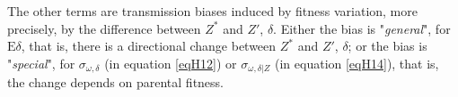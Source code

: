 The other terms are transmission biases induced by fitness variation, more precisely, by the difference between $Z^{\ast}$ and $Z'$, $\delta$. Either the bias is "\emph{general}", for $\mathrm{E}\delta$, that is, there is a directional change between $Z^{\ast}$ and $Z'$, $\delta$; or the bias is "\emph{special}", for $\sigma_{\omega,\delta}$ (in equation \ref{eqH12}) or $\sigma_{\omega,\delta | Z}$ (in equation \ref{eqH14}), that is, the change depends on parental fitness.







